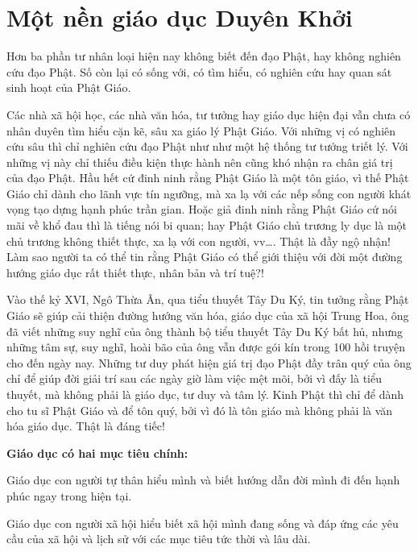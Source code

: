 \chapter{Một nền giáo dục Duyên Khởi} %
\label{cha:mot_nen_giao_duc_duyen_khoi}

Hơn ba phần tư nhân loại hiện nay không biết đến đạo Phật, hay không nghiên cứu đạo Phật. Số còn lại có sống với, có tìm hiểu, có nghiên cứu hay quan sát sinh hoạt của Phật Giáo.

Các nhà xã hội học, các nhà văn hóa, tư tưởng hay giáo dục hiện đại vẫn chưa có nhân duyên tìm hiểu cặn kẽ, sâu xa giáo lý Phật Giáo. Với những vị có nghiên cứu sâu thì chỉ nghiên cứu đạo Phật như như một hệ thống tư tưởng triết lý. Với những vị này chỉ thiếu điều kiện thực hành nên cũng khó nhận ra chân giá trị của đạo Phật. Hầu hết cứ đinh ninh rằng Phật Giáo là một tôn giáo, vì thế Phật Giáo chỉ dành cho lãnh vực tín ngưỡng, mà xa lạ với các nếp sống con người khát vọng tạo dựng hạnh phúc trần gian. Hoặc giả đinh ninh rằng Phật Giáo cứ nói mãi về khổ đau thì là tiếng nói bi quan; hay Phật Giáo chủ trương ly dục là một chủ trương không thiết thực, xa lạ với con người, vv\ldots. Thật là đầy ngộ nhận! Làm sao người ta có thể tin rằng Phật Giáo có thể giới thiệu với đời một đường hướng giáo dục rất thiết thực, nhân bản và trí tuệ?!

Vào thế kỷ XVI, Ngô Thừa Ân, qua tiểu thuyết Tây Du Ký, tin tưởng rằng Phật Giáo sẽ giúp cải thiện đường hướng văn hóa, giáo dục của xã hội Trung Hoa, ông đã viết những suy nghĩ của ông thành bộ tiểu thuyết Tây Du Ký bất hủ, nhưng những tâm sự, suy nghĩ, hoài bão của ông vẫn được gói kín trong 100 hồi truyện cho đến ngày nay. Những tư duy phát hiện giá trị đạo Phật đầy trân quý của ông chỉ để giúp đời giải trí sau các ngày giờ làm việc mệt mõi, bởi vì đấy là tiểu thuyết, mà không phải là giáo dục, tư duy và tâm lý. Kinh Phật thì chỉ để dành cho tu sĩ Phật Giáo và để tôn quý, bởi vì đó là tôn giáo mà không phải là văn hóa giáo dục. Thật là đáng tiếc!

{\bf Giáo dục có hai mục tiêu chính:}

\begin{newenumerate}

    \item Giáo dục con người tự thân hiểu mình và biết hướng dẫn đời mình đi đến hạnh phúc ngay trong hiện tại.

    \item Giáo dục con người xã hội hiểu biết xã hội mình đang sống và đáp ứng các yêu cầu của xã hội và lịch sử với các mục tiêu tức thời và lâu dài.
\end{newenumerate}

